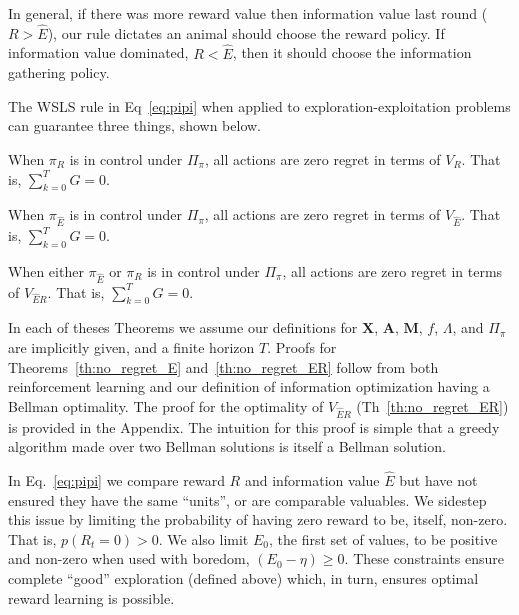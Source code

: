 In general, if there was more reward value then information value last round ($R > \hat E$), our rule dictates an animal should choose the reward policy. If information value dominated, $R < \hat E$, then it should choose the information gathering policy.

The WSLS rule in Eq~\ref{eq:pipi} when applied to exploration-exploitation problems can guarantee three things, shown below. 

\begin{theorem}
	\label{th:no_regret_R}
	When $\pi_R$ is in control under $\Pi_{\pi}$, all actions are zero regret in terms of $V_R$. That is, $\sum_{k=0}^{T} G = 0$.
\end{theorem}

\begin{theorem}
	\label{th:no_regret_E}
	When $\pi_{\hat E}$ is in control under $\Pi_{\pi}$, all actions are zero regret in terms of $V_{\hat E}$. That is, $\sum_{k=0}^{T} G = 0$.
\end{theorem}

\begin{theorem}
	\label{th:no_regret_ER}
	When either $\pi_{\hat E}$ or $\pi_R$ is in control under $\Pi_{\pi}$, all actions are zero regret in terms of $V_{\hat{E}R}$. That is, $\sum_{k=0}^{T} G = 0$.
\end{theorem}

In each of theses Theorems we assume our definitions for $\mathbf{X}$, $\mathbf{A}$, $\mathbf{M}$, $f$, $\Lambda$, and $\Pi_{\pi}$ are implicitly given, and a finite horizon $T$. Proofs for Theorems~\ref{th:no_regret_E} and~\ref{th:no_regret_ER} follow from both reinforcement learning and our definition of information optimization having a Bellman optimality. The proof for the optimality of $V_{\hat{E}R}$ (Th~\ref{th:no_regret_ER}) is provided in the Appendix. The intuition for this proof is simple that a greedy algorithm made over two Bellman solutions is itself a Bellman solution.

In Eq.~\ref{eq:pipi} we compare reward $R$ and information value $\hat E$ but have not ensured they have the same ``units'', or are comparable valuables. We sidestep this issue by limiting the probability of having zero reward to be, itself, non-zero. That is, $p(R_t=0) > 0$. We also limit $E_0$, the first set of values, to be positive and non-zero when used with boredom, $(E_0 - \eta) \geq 0$. These constraints ensure complete ``good'' exploration (defined above) which, in turn, ensures optimal reward learning is possible.



